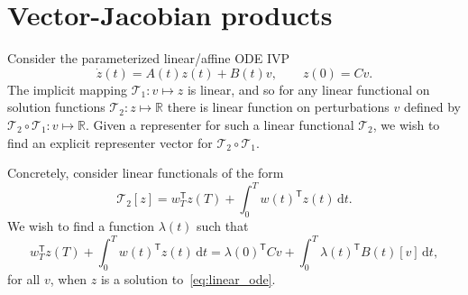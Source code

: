 \documentclass{article}
\begin{document}
\section{Vector-Jacobian products}
Consider the parameterized linear/affine ODE IVP
\begin{equation}
    \dot z(t) = A(t) z(t) + B(t) v, \qquad z(0) = C v.
    \label{eq:linear_ode}
\end{equation}
The implicit mapping $\mathcal{T}_1: v \mapsto z$ is linear, and so for any
linear functional on solution functions $\mathcal{T}_2 : z \mapsto \mathbb{R}$
there is linear function on perturbations $v$ defined by $\mathcal{T}_2 \circ
\mathcal{T}_1 : v \mapsto \mathbb{R}$. Given a representer for such a linear
functional $\mathcal{T}_2$, we wish to find an explicit representer vector for
$\mathcal{T}_2 \circ \mathcal{T}_1$.

Concretely, consider linear functionals of the form
\begin{equation}
    \mathcal{T}_2[z] = w_T^\mathsf{T} z(T) + \int_0^T w(t)^\mathsf{T} z(t) \, \mathrm{d}t.
    \label{eq:functional}
\end{equation}
We wish to find a function $\lambda(t)$ such that
\begin{equation}
    w_T^\mathsf{T} z(T) + \int_0^T w(t)^\mathsf{T} z(t) \, \mathrm{d}t
    =
    \lambda(0)^\mathsf{T} C v + \int_0^T \lambda(t)^\mathsf{T} B(t)[v] \, \mathrm{d}t,
\end{equation}
for all $v$, when $z$ is a solution to~\eqref{eq:linear_ode}.
\end{document}
